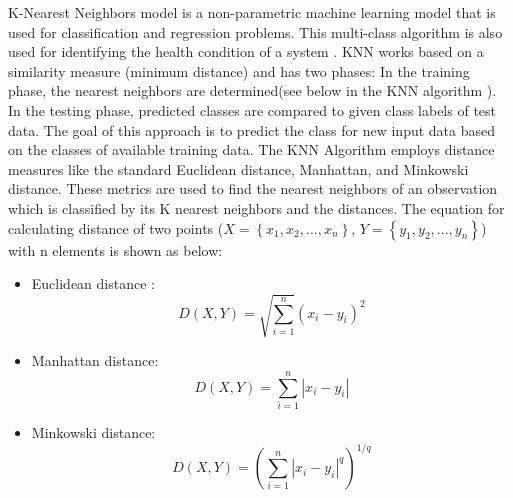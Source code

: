 K-Nearest Neighbors model is a non-parametric machine learning model that is used for classification and regression problems. This multi-class algorithm is also used for identifying the health condition of a system \cite{hasan2020health}. KNN works based on a similarity measure (minimum distance) and has two phases: 
In the training phase, the nearest neighbors are determined(see below in the KNN algorithm ). In the testing phase, predicted classes are compared to given class labels of test data. The goal of this approach is to predict the class for new input data based on the classes of available training data.
The KNN Algorithm employs distance measures like the standard Euclidean distance, Manhattan, and Minkowski distance. These metrics are used to find the nearest neighbors of an observation which is classified by its K nearest neighbors and the distances. The equation for calculating distance of two points
($X=\left \{ x_{1},x_{2},...,x_{n} \right \}$, $Y=\left \{ y_{1},y_{2},...,y_{n} \right \}$) with n elements is shown as below:
\begin{itemize}
\item  Euclidean distance : 
\begin{equation}
D(X,Y)=\sqrt{\sum_{i=1}^{n}}(x_{i}-y_{i})^{2} 
\end{equation}
\vspace*{-4mm}
\item  Manhattan distance: 
\begin{equation}
    D(X,Y)=\sum_{i=1}^{n}\left | x_{i}-y_{i} \right |
\end{equation}
\vspace*{-4mm}
\item Minkowski distance:
\begin{equation}
D(X,Y)=\left (\sum_{i=1}^{n}\left | x_{i}-y_{i} \right | ^{q} \right )^{1/q}
\end{equation}
\vspace*{-4mm}
\end{itemize}
